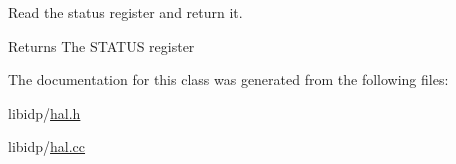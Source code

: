 \label{classIDP_1_1HardwareAbstractionLayer_a466af55473ec6b65d1f5069cfc88e774}
Read the status register and return it. \begin{DoxyReturn}{Returns}
The STATUS register 
\end{DoxyReturn}


The documentation for this class was generated from the following files:\begin{DoxyCompactItemize}
\item 
libidp/\hyperlink{hal_8h}{hal.h}\item 
libidp/\hyperlink{hal_8cc}{hal.cc}\end{DoxyCompactItemize}
